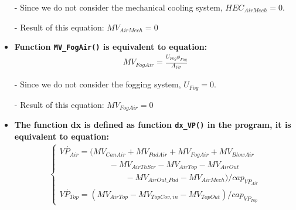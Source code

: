 \documentclass[a4paper]{article}
\numberwithin{equation}{section}
\begin{document}
\begin{itemize}
  \item[-] Since we do not consider the mechanical cooling system, \(HEC_{AirMech} = 0\).
  \item[-] Result of this equation: \(MV_{AirMech} = 0\)

  \item \textbf{Function \texttt{MV\_FogAir()} is equivalent to equation:}
        \begin{align*}
          MV_{FogAir} = \frac{U_{Fog} \phi_{Fog}}{A_{Flr}}
        \end{align*}

  \item[-] Since we do not consider the fogging system, \(U_{Fog} = 0\).
  \item[-] Result of this equation: \(MV_{FogAir} = 0\)

  \item \textbf{The function \textbf{dx} is defined as function \texttt{dx\_VP()} in the program, it is equivalent to equation:}
        \begin{align*}
          \begin{cases}
            \dot{VP_{Air}} = (MV_{CanAir} + MV_{PadAir} + MV_{FogAir} + MV_{BlowAir} \\ \qquad \qquad \qquad
            - MV_{AirThScr} - MV_{AirTop} - MV_{AirOut}                              \\ \qquad \qquad \qquad \qquad
            - MV_{AirOut\_Pad} - MV_{AirMech}) / cap_{VP_{Air}}                      \\
            \dot{VP_{Top}} = (MV_{AirTop} - MV_{TopCov,in} - MV_{TopOut}) / cap_{VP_{Top}}
          \end{cases}
        \end{align*}


\end{itemize}
\end{document}
